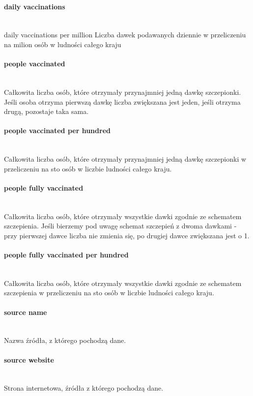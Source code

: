 \documentclass[12pt, oneside]{article}
\begin{document}
\paragraph{daily vaccinations}
\mbox{}\\
daily vaccinations per million
Liczba dawek podawanych dziennie w przeliczeniu na milion osób w ludności całego
kraju

\paragraph{people vaccinated}
\mbox{}\\
Całkowita liczba osób, które otrzymały przynajmniej jedną dawkę szczepionki. Jeśli
osoba otrzyma pierwszą dawkę liczba zwiększana jest jeden, jeśli otrzyma drugą, pozostaje taka sama.

\paragraph{people vaccinated per hundred}
\mbox{}\\
Całkowita liczba osób, które otrzymały przynajmniej jedną dawkę szczepionki w przeliczeniu na sto osób w liczbie ludności całego kraju.

\paragraph{people fully vaccinated}
\mbox{}\\
Całkowita liczba osób, które otrzymały wszystkie dawki zgodnie ze schematem szczepienia. Jeśli bierzemy pod uwagę schemat szczepień z dwoma dawkami - przy pierwszej
dawce liczba nie zmienia się, po drugiej dawce zwiększana jest o 1.

\paragraph{people fully vaccinated per hundred}
\mbox{}\\
Całkowita liczba osób, które otrzymały wszystkie dawki zgodnie ze schematem szczepienia w przeliczeniu na sto osób w liczbie ludności całego kraju.

\paragraph{source name}
\mbox{}\\
Nazwa źródła, z którego pochodzą dane.

\paragraph{source website}
\mbox{}\\
Strona internetowa, źródła z którego pochodzą dane.
\end{document}
